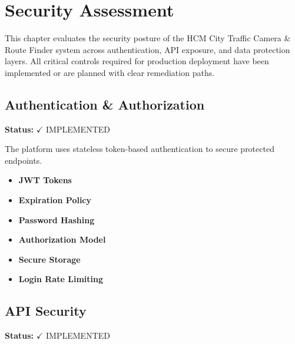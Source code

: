 \chapter{Security Assessment}
\label{chap:security}

This chapter evaluates the security posture of the HCM City Traffic Camera \& Route Finder system across authentication, API exposure, and data protection layers. All critical controls required for production deployment have been implemented or are planned with clear remediation paths.

\section{Authentication \& Authorization}
\textbf{Status:} $\checkmark$ IMPLEMENTED

The platform uses stateless token-based authentication to secure protected endpoints.
\begin{itemize}
    \item \textbf{JWT Tokens}%
    \item \textbf{Expiration Policy}%
    \item \textbf{Password Hashing}%
    \item \textbf{Authorization Model}%
    \item \textbf{Secure Storage}%
    \item \textbf{Login Rate Limiting}%
\end{itemize}

\section{API Security}
\textbf{Status:} $\checkmark$ IMPLEMENTED

